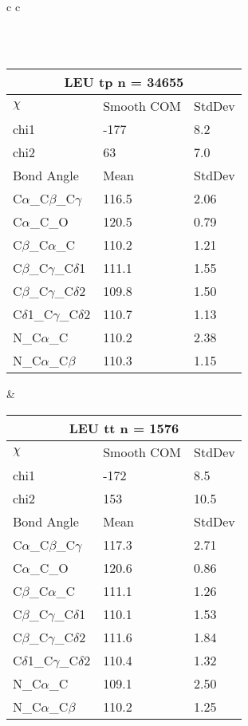 \begin{longtable}{ c c }
\begin{tabular}{ l l l }
  \bottomrule
  \end{tabular}
  \\
  \begin{tabular}{ l l l }
  \toprule
  \multicolumn{3}{c}{LEU \textbf{tp} n = 34655} \\ \toprule
  $\chi$       & Smooth COM & StdDev \\ \midrule
  chi1 & -177 & 8.2 \\ 
  chi2 & 63 & 7.0 \\ \midrule
  Bond Angle   & Mean     & StdDev \\ \midrule
  C$\alpha$\_C$\beta$\_C$\gamma$ & 116.5 & 2.06\\
  C$\alpha$\_C\_O & 120.5 & 0.79\\
  C$\beta$\_C$\alpha$\_C & 110.2 & 1.21\\
  C$\beta$\_C$\gamma$\_C$\delta$1 & 111.1 & 1.55\\
  C$\beta$\_C$\gamma$\_C$\delta$2 & 109.8 & 1.50\\
  C$\delta$1\_C$\gamma$\_C$\delta$2 & 110.7 & 1.13\\
  N\_C$\alpha$\_C & 110.2 & 2.38\\
  N\_C$\alpha$\_C$\beta$ & 110.3 & 1.15\\
  \bottomrule
  \end{tabular}
  &
  \begin{tabular}{ l l l }
  \toprule
  \multicolumn{3}{c}{LEU \textbf{tt} n = 1576} \\ \toprule
  $\chi$       & Smooth COM & StdDev \\ \midrule
  chi1 & -172 & 8.5 \\ 
  chi2 & 153 & 10.5 \\ \midrule
  Bond Angle   & Mean     & StdDev \\ \midrule
  C$\alpha$\_C$\beta$\_C$\gamma$ & 117.3 & 2.71\\
  C$\alpha$\_C\_O & 120.6 & 0.86\\
  C$\beta$\_C$\alpha$\_C & 111.1 & 1.26\\
  C$\beta$\_C$\gamma$\_C$\delta$1 & 110.1 & 1.53\\
  C$\beta$\_C$\gamma$\_C$\delta$2 & 111.6 & 1.84\\
  C$\delta$1\_C$\gamma$\_C$\delta$2 & 110.4 & 1.32\\
  N\_C$\alpha$\_C & 109.1 & 2.50\\
  N\_C$\alpha$\_C$\beta$ & 110.2 & 1.25\\
  \bottomrule
  \end{tabular}
  \\

\end{longtable}
